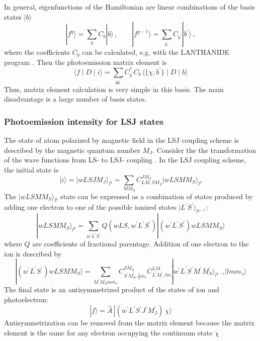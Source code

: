 \documentclass[a4paper,oneside,12pt]{extarticle}
\begin{document}
In general, eigenfunctions of the Hamiltonian are linear combinations of the basis states $|b\rangle$
$$
|f^q\rangle = \sum_b C_b |b\rangle \,, \qquad |f^{q-1}\rangle = \sum_{b^{\prime}} C_{b^{\prime}} |b^{\prime}\rangle \,,
$$
where the coefficients $C_b$ can be calculated, e.g. with the LANTHANIDE program \cite{Lanthanide_2001}.
Then the photoemission matrix element is
\begin{equation}
\langle f \mid D \mid i \rangle = 
\sum_{b b^{\prime}}   C_{b^{\prime}}^*  C_b \,
\langle \{ \chi, b^{\prime} \} \mid D \mid b \rangle
\end{equation}
Thus, matrix element calculation is very simple in this basis. The main disadvantage is a large number of basis states.

\subsubsection {Photoemission intensity for LSJ states}
The state of atom polarized by magnetic field in the LSJ coupling scheme is
described by the magnetic quantum number $M_J$.
Consider the the transformation of the wave functions from LS- to LSJ- coupling \cite{Cox_1975}.
In the LSJ coupling scheme, the initial state is
$$
| i \rangle = |wLSJM_J \rangle_{l^q} = \sum_{M M_S} C^{J M_J}_{L M, S M_S} |w LS M M_S \rangle_{l^q}
$$
The $|wLS M M_S \rangle_{l^q}$ state can be expressed as a combination of states produced by adding one electron to one of the possible ionized states $|L^{\prime} S^{\prime} \rangle_{l^{q-1}}$:
$$
|w LS M M_S \rangle_{l^q} = \sum_{w^{\prime}L^{\prime} S^{\prime}}  Q(wLS,w^{\prime}L^{\prime}S^{\prime})
| (w^{\prime}L^{\prime} S^{\prime}) wLS M M_S \rangle
$$
where $Q$ are coefficients of fractional parentage.
Addition of one electron to the ion is described by
$$
| (w^{\prime}L^{\prime} S^{\prime}) wLS M M_S \rangle = \sum_{M^{\prime} M_S^{\prime} m m_s} 
C^{SM_S}_{S^{\prime}M_S^{\prime}, \frac{1}{2}m_s} C^{LM}_{L^{\prime} M^{\prime}, lm}
| w^{\prime}L^{\prime} S^{\prime} M^{\prime} M_S^{\prime} \rangle_{l^{q-1}}
| lm m_s \rangle
$$
The final state is an antisymmetrized product of the states of ion and photoelectron:
$$
| f \rangle = \hat A \, |(w^{\prime}L^{\prime} S^{\prime} J^{\prime} M_J^{\prime}) \,  \chi \rangle
$$
Antisymmetrization can be removed from the matrix element because the matrix element is the same for any electron occupying the continuum state $\chi$
\end{document}
